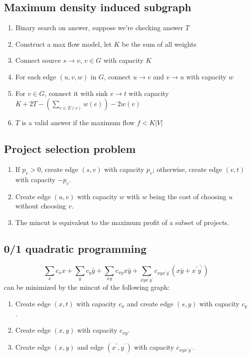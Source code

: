 \subsection{Maximum density induced subgraph}
\vspace{-0.2em}
\begin{enumerate}
	\itemsep-0.8em
	\item Binary search on answer, suppose we're checking answer $T$
	\item Construct a max flow model, let $K$ be the sum of all weights
	\item Connect source $s \rightarrow v$, $v \in G$ with capacity $K$
	\item For each edge $(u, v, w)$ in $G$, connect $u \rightarrow v$ and $v \rightarrow u$ with capacity $w$
	\item For $v \in G$, connect it with sink $v \rightarrow t$ with capacity $K + 2T - (\sum_{e \in E(v)}{w(e)}) - 2w(v)$
	\item $T$ is a valid answer if the maximum flow $f < K \lvert V \rvert$
\end{enumerate}

\subsection{Project selection problem}
\vspace{-0.2em}
    \begin{enumerate}
		\itemsep-0.8em
      \item If $p_v > 0$, create edge $(s, v)$ with capacity $p_v$; otherwise, create edge $(v, t)$ with capacity $-p_v$.
      \item Create edge $(u, v)$ with capacity $w$ with $w$ being the cost of choosing $u$ without choosing $v$.
      \item The mincut is equivalent to the maximum profit of a subset of projects.
    \end{enumerate}

\subsection{0/1 quadratic programming}
\vspace{-0.2em}
    \[ \sum_x{c_xx} + \sum_y{c_y\bar{y}} + \sum_{xy}c_{xy}x\bar{y} + \sum_{xyx^\prime y^\prime}c_{xyx^\prime y^\prime}(x\bar{y} + x^\prime\bar{y^\prime}) \]
    can be minimized by the mincut of the following graph:
    \begin{enumerate}
      \itemsep-0.8em
      \item Create edge $(x, t)$ with capacity $c_x$ and create edge $(s, y)$ with capacity $c_y$.
      \item Create edge $(x, y)$ with capacity $c_{xy}$.
      \item Create edge $(x, y)$ and edge $(x^\prime, y^\prime)$ with capacity $c_{xyx^\prime y^\prime}$.
    \end{enumerate}

